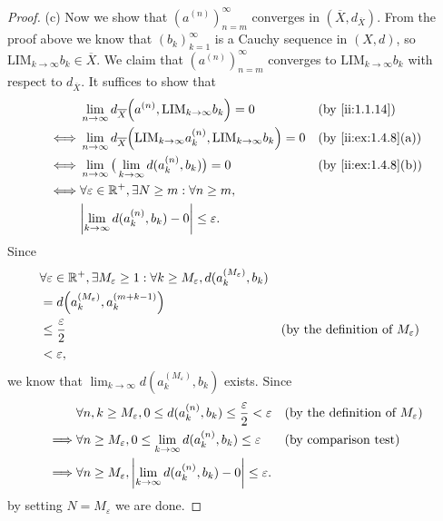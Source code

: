 \begin{proof}{(c)}
  Now we show that \((a^{(n)})_{n = m}^\infty\) converges in \((\overline{X}, d_{\overline{X}})\).
  From the proof above we know that \((b_k)_{k = 1}^\infty\) is a Cauchy sequence in \((X, d)\), so \(\text{LIM}_{k \to \infty} b_k \in \overline{X}\).
  We claim that \((a^{(n)})_{n = m}^\infty\) converges to \(\text{LIM}_{k \to \infty} b_k\) with respect to \(d_{\overline{X}}\).
  It suffices to show that
  \begin{align*}
         & \lim_{n \to \infty} d_{\overline{X}}\Big(a^{(n)}, \text{LIM}_{k \to \infty} b_k\Big) = 0                             &  & \by{ii:1.1.14}      \\
    \iff & \lim_{n \to \infty} d_{\overline{X}}\Big(\text{LIM}_{k \to \infty} a_k^{(n)}, \text{LIM}_{k \to \infty} b_k\Big) = 0 &  & \by{ii:ex:1.4.8}[a] \\
    \iff & \lim_{n \to \infty} \big(\lim_{k \to \infty} d(a_k^{(n)}, b_k)\big) = 0                                              &  & \by{ii:ex:1.4.8}[b] \\
    \iff & \forall \varepsilon \in \R^+, \exists N \geq m : \forall n \geq m,                                                                         \\
         & \abs{\lim_{k \to \infty} d(a_k^{(n)}, b_k) - 0} \leq \varepsilon.
  \end{align*}
  Since
  \begin{align*}
     & \forall \varepsilon \in \mathbb{R}^+, \exists M_\varepsilon \geq 1 : \forall k \geq M_\varepsilon, d(a_k^{(M_\varepsilon)}, b_k)                                                      \\
     & = d\Big(a_k^{(M_\varepsilon)}, a_k^{(m + k - 1)}\Big)                                                                                                                         \\
     & \leq \dfrac{\varepsilon}{2}                                                                                              &  & \text{(by the definition of \(M_\varepsilon\))} \\
     & < \varepsilon,
  \end{align*}
  we know that \(\lim_{k \to \infty} d(a_k^{(M_\varepsilon)}, b_k)\) exists.
  Since
  \begin{align*}
             & \forall n, k \geq M_\varepsilon, 0 \leq d(a_k^{(n)}, b_k) \leq \dfrac{\varepsilon}{2} < \varepsilon &  & \text{(by the definition of \(M_\varepsilon\))} \\
    \implies & \forall n \geq M_\varepsilon, 0 \leq \lim_{k \to \infty} d(a_k^{(n)}, b_k) \leq \varepsilon         &  & \text{(by comparison test)}                     \\
    \implies & \forall n \geq M_\varepsilon, \left\lvert\lim_{k \to \infty} d(a_k^{(n)}, b_k) - 0\right\rvert \leq \varepsilon.
  \end{align*}
  by setting \(N = M_\varepsilon\) we are done.


\end{proof}
